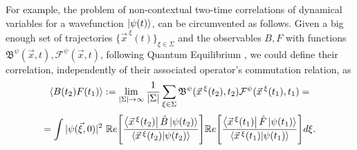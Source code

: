 \documentclass[11pt, a4paper]{article} %
\newcommand{\B}{\mathfrak{B}}
\begin{document}
For example, the problem of non-contextual two-time correlations of dynamical variables for a wavefunction $\ket{\psi(t)}$, can be circumvented as follows. Given a big enough set of trajectories $\{\vec{x}^{\:\xi}(t)\}_{\xi\in \Sigma}$ and the observables $B,F$ with functions $\B^\psi(\vec{x},t),\mathcal{F}^\psi(\vec{x},t)$, following Quantum Equilibrium \cite{Absolute}, we could define their correlation, independently of their associated operator's commutation relation, as\vspace{-0.1cm}
\begin{equation}
\langle B(t_2)F(t_1)\rangle := \lim_{|\Sigma|\rightarrow \infty}\frac{1}{|\Sigma|} \sum_{\xi\in\Sigma} \B^\psi(\vec{x}^{\:\xi}(t_2),t_2)\mathcal{F}^\psi(\vec{x}^{\:\xi}(t_1),t_1) =\vspace{-0.1cm}
\end{equation}
$$
=  \int |\psi(\vec{\xi},0)|^2\ \mathbb{R}e\qty[ \frac{\bra{\vec{x}^{\:\xi}(t_2)}\hat{B}\ket{\psi(t_2)}}{\bra{\vec{x}^{\:\xi}(t_2)}\ket{\psi(t_2)}} ] \mathbb{R}e\qty[ \frac{\bra{\vec{x}^{\:\xi}(t_1)}\hat{F}\ket{\psi(t_1)}}{\bra{\vec{x}^{\:\xi}(t_1)}\ket{\psi(t_1)}} ]d\xi.
$$
\end{document}
